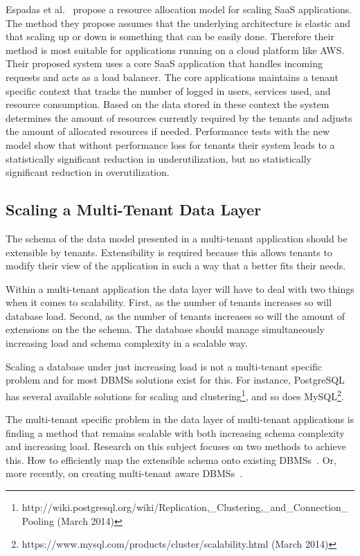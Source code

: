 Espadas et al.~\cite{espadas2013tenant} propose a resource allocation model for scaling SaaS applications.
The method they propose assumes that the underlying architecture is elastic and that scaling up or down is something that can be easily done.
Therefore their method is most suitable for applications running on a cloud platform like \ac{AWS}. 
Their proposed system uses a core SaaS application that handles incoming requests and acts as a load balancer. The core applications maintains a tenant specific context that tracks the number of logged in users, services used, and resource consumption.
Based on the data stored in these context the system determines the amount of resources currently required by the tenants and adjusts the amount of allocated resources if needed.
Performance tests with the new model show that without performance loss for tenants their system leads to a statistically significant reduction in underutilization, but no statistically significant reduction in overutilization. 


\subsection{Scaling a Multi-Tenant Data Layer}
The schema of the data model presented in a multi-tenant application should be extensible by tenants.
Extensibility is required because this allows tenants to modify their view of the application in such a way that a better fits their needs.

Within a multi-tenant application the data layer will have to deal with two things when it comes to scalability.
First, as the number of tenants increases so will database load.
Second, as the number of tenants increases so will the amount of extensions on the the schema.
The database should  manage simultaneously increasing load and schema complexity in a scalable way.

Scaling a database under just increasing load is not a multi-tenant specific problem and for most \acp{DBMS} solutions exist for this. 
For instance, PostgreSQL has several available solutions for scaling and clustering\footnote{http://wiki.postgresql.org/wiki/Replication,\_Clustering,\_and\_Connection\_Pooling (March 2014)}, and so does MySQL\footnote{https://www.mysql.com/products/cluster/scalability.html (March 2014)}.

The multi-tenant specific problem in the data layer of multi-tenant applications is finding a method that remains scalable with both increasing schema complexity and increasing load.
Research on this subject focuses on two methods to achieve this.
How to efficiently map the extensible schema onto existing \acp{DBMS}~\cite{aulbach2008multi, aulbach2009comparison}.
Or, more recently, on creating multi-tenant aware \acp{DBMS}~\cite{schiller2011native, aulbach2011extensibility}.


